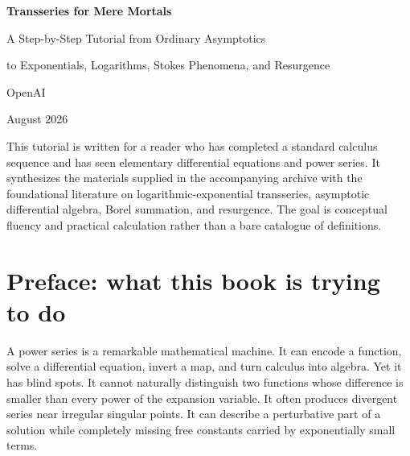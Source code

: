 \documentclass[11pt,oneside,openany]{book}
\newcommand{\e}{\mathrm{e}}
\theoremstyle{plain}
\theoremstyle{definition}
\theoremstyle{remark}
\begin{document}
\frontmatter
\hypersetup{pageanchor=false}
\begin{titlepage}
\centering
\vspace*{1.25cm}
{\Huge\bfseries\color{DeepBlue} Transseries for Mere Mortals\par}
\vspace{0.45cm}
{\LARGE A Step-by-Step Tutorial from Ordinary Asymptotics\par
 to Exponentials, Logarithms, Stokes Phenomena, and Resurgence\par}
\vspace{1.2cm}
\vfill
{\Large OpenAI\par}
\vspace{0.25cm}
{\large August 2026\par}
\vfill
\begin{minipage}{0.86\textwidth}
\small
This tutorial is written for a reader who has completed a standard calculus sequence and has seen elementary differential equations and power series. It synthesizes the materials supplied in the accompanying archive with the foundational literature on logarithmic-exponential transseries, asymptotic differential algebra, Borel summation, and resurgence. The goal is conceptual fluency and practical calculation rather than a bare catalogue of definitions.
\end{minipage}
\end{titlepage}
\hypersetup{pageanchor=true}

\chapter*{Preface: what this book is trying to do}

A power series is a remarkable mathematical machine. It can encode a function, solve a differential equation, invert a map, and turn calculus into algebra. Yet it has blind spots. It cannot naturally distinguish two functions whose difference is smaller than every power of the expansion variable. It often produces divergent series near irregular singular points. It can describe a perturbative part of a solution while completely missing free constants carried by exponentially small terms.
\end{document}
